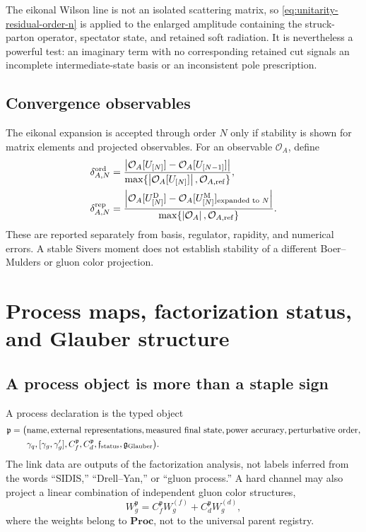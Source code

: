 \documentclass[11pt]{article}
\newcommand{\Proc}{\mathbf{Proc}}
\newcommand{\cO}{\mathcal O}
\begin{document}
The eikonal Wilson line is not an isolated scattering matrix, so
\cref{eq:unitarity-residual-order-n} is applied to the enlarged amplitude
containing the struck-parton operator, spectator state, and retained soft
radiation.  It is nevertheless a powerful test: an imaginary term with no
corresponding retained cut signals an incomplete intermediate-state basis or
an inconsistent pole prescription.

\subsection{Convergence observables}

The eikonal expansion is accepted through order \(N\) only if stability is
shown for matrix elements and projected observables.  For an observable
\(\cO_A\), define
\begin{align}
 \delta^{\rm ord}_{A,N}
 & =
 \frac{
  \left|\cO_A[U_{[N]}]-\cO_A[U_{[N-1]}]\right|
 }{
  \max\{\left|\cO_A[U_{[N]}]\right|,\cO_{A,\rm ref}\}
 },
\label{eq:eikonal-order-residual}\\
 \delta^{\rm rep}_{A,N}
 & =
 \frac{
  \left|\cO_A[U_{[N]}^{\rm D}]
       -\cO_A[U_{[N]}^{\rm M}]_{\text{expanded to }N}\right|
 }{
  \max\{\left|\cO_A\right|,\cO_{A,\rm ref}\}
 }.
\label{eq:representation-residual}
\end{align}
These are reported separately from basis, regulator, rapidity, and numerical
errors.  A stable Sivers moment does not establish stability of a different
Boer--Mulders or gluon color projection.

\section{Process maps, factorization status, and Glauber structure}
\label{sec:process-factorization}

\subsection{A process object is more than a staple sign}

A process declaration is the typed object
\begin{equation}
\begin{aligned}
 \mathfrak p=\bigl(&
 \text{name},\text{external representations},\text{measured final state},
 \text{power accuracy},\text{perturbative order},\\
 &\gamma_q,[\gamma_g,\gamma'_g],
 C_f^{\mathfrak p},C_d^{\mathfrak p},
 \mathfrak f_{\rm status},\mathfrak g_{\rm Glauber}\bigr).
\end{aligned}
\label{eq:process-object}
\end{equation}
The link data are outputs of the factorization analysis, not labels inferred
from the words ``SIDIS,'' ``Drell--Yan,'' or ``gluon process.''  A hard
channel may also project a linear combination of independent gluon color
structures,
\begin{equation}
 W_{g}^{\mathfrak p}
 =C_f^{\mathfrak p}W_g^{(f)}
  +C_d^{\mathfrak p}W_g^{(d)},
\label{eq:process-fd-combination}
\end{equation}
where the weights belong to \(\Proc\), not to the universal parent registry.
\end{document}
